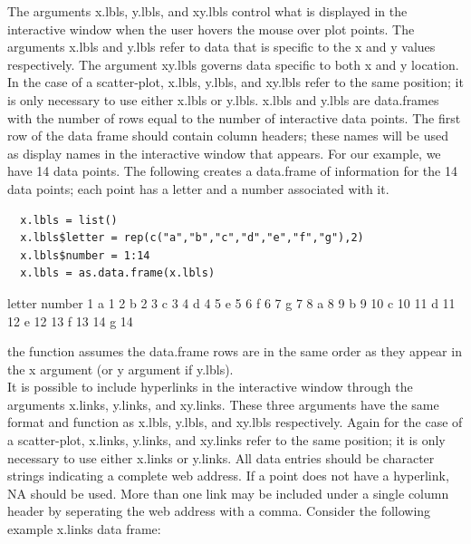\documentclass[]{article}
\begin{document}
\indent The arguments x.lbls, y.lbls, and xy.lbls control what is displayed in the interactive window when the user hovers the mouse over plot points. The arguments x.lbls and y.lbls refer to data that is specific to the x and y values respectively. The argument xy.lbls governs data specific to both x and y location. In the case of a scatter-plot, x.lbls, y.lbls, and xy.lbls refer to the same position; it is only necessary to use either x.lbls or y.lbls. x.lbls and y.lbls are data.frames with the number of rows equal to the number of interactive data points. The first row of the data frame should contain column headers; these names will be used as display names in the interactive window that appears. \newline
\indent For our example, we have 14 data points. The following creates a data.frame of information for the 14 data points; each point has a letter and a number associated with it. 
\begin{verbatim}
  x.lbls = list()
  x.lbls$letter = rep(c("a","b","c","d","e","f","g"),2)
  x.lbls$number = 1:14
  x.lbls = as.data.frame(x.lbls)
\end{verbatim}
\begin{Schunk}
\begin{Soutput}
   letter number
1       a      1
2       b      2
3       c      3
4       d      4
5       e      5
6       f      6
7       g      7
8       a      8
9       b      9
10      c     10
11      d     11
12      e     12
13      f     13
14      g     14
\end{Soutput}
\end{Schunk}
 the function assumes the data.frame rows are in the same order as they appear in the x argument (or y argument if y.lbls).  \newline
\\
\indent It is possible to include hyperlinks in the interactive window through the arguments x.links, y.links, and xy.links. These three arguments have the same format and function as x.lbls, y.lbls, and xy.lbls respectively. Again for the case of a scatter-plot,  x.links, y.links, and xy.links refer to the same position; it is only necessary to use either x.links or y.links. All data entries should be character strings indicating a complete web address. If a point does not have a hyperlink, NA should be used. More than one link may be included under a single column header by seperating the web address with a comma. Consider the following example x.links data frame:
\end{document}
